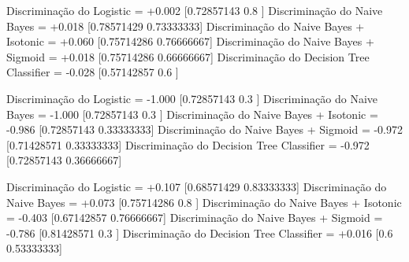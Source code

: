 Discriminação do Logistic = +0.002
[0.72857143 0.8       ]
Discriminação do Naive Bayes = +0.018
[0.78571429 0.73333333]
Discriminação do Naive Bayes + Isotonic = +0.060
[0.75714286 0.76666667]
Discriminação do Naive Bayes + Sigmoid = +0.018
[0.75714286 0.66666667]
Discriminação do Decision Tree Classifier = -0.028
[0.57142857 0.6       ]

Discriminação do Logistic = -1.000
[0.72857143 0.3       ]
Discriminação do Naive Bayes = -1.000
[0.72857143 0.3       ]
Discriminação do Naive Bayes + Isotonic = -0.986
[0.72857143 0.33333333]
Discriminação do Naive Bayes + Sigmoid = -0.972
[0.71428571 0.33333333]
Discriminação do Decision Tree Classifier = -0.972
[0.72857143 0.36666667]

Discriminação do Logistic = +0.107
[0.68571429 0.83333333]
Discriminação do Naive Bayes = +0.073
[0.75714286 0.8       ]
Discriminação do Naive Bayes + Isotonic = -0.403
[0.67142857 0.76666667]
Discriminação do Naive Bayes + Sigmoid = -0.786
[0.81428571 0.3       ]
Discriminação do Decision Tree Classifier = +0.016
[0.6        0.53333333]


\begin{table}
    \centering
    \caption{Dataset de Reincidência Criminal sem pré-processamento.}
    \label{table:recindSemPP}
    \end{table}